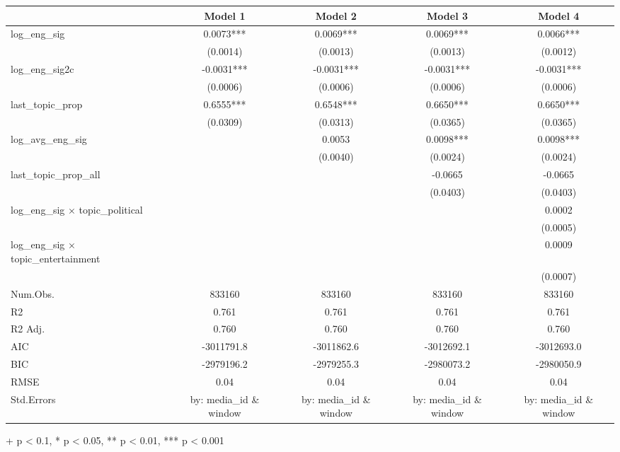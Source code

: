 \setlength{\LTpost}{0mm}
\begin{longtable}{lcccc}
\toprule
  & Model 1 & Model 2 & Model 3 & Model 4 \\ 
\midrule
log\_eng\_sig & 0.0073*** & 0.0069*** & 0.0069*** & 0.0066*** \\ 
 & (0.0014) & (0.0013) & (0.0013) & (0.0012) \\ 
log\_eng\_sig2c & -0.0031*** & -0.0031*** & -0.0031*** & -0.0031*** \\ 
 & (0.0006) & (0.0006) & (0.0006) & (0.0006) \\ 
last\_topic\_prop & 0.6555*** & 0.6548*** & 0.6650*** & 0.6650*** \\ 
 & (0.0309) & (0.0313) & (0.0365) & (0.0365) \\ 
log\_avg\_eng\_sig &  & 0.0053 & 0.0098*** & 0.0098*** \\ 
 &  & (0.0040) & (0.0024) & (0.0024) \\ 
last\_topic\_prop\_all &  &  & -0.0665 & -0.0665 \\ 
 &  &  & (0.0403) & (0.0403) \\ 
log\_eng\_sig × topic\_political &  &  &  & 0.0002 \\ 
 &  &  &  & (0.0005) \\ 
log\_eng\_sig × topic\_entertainment &  &  &  & 0.0009 \\ 
 &  &  &  & (0.0007) \\ 
Num.Obs. & 833160 & 833160 & 833160 & 833160 \\ 
R2 & 0.761 & 0.761 & 0.761 & 0.761 \\ 
R2 Adj. & 0.760 & 0.760 & 0.760 & 0.760 \\ 
AIC & -3011791.8 & -3011862.6 & -3012692.1 & -3012693.0 \\ 
BIC & -2979196.2 & -2979255.3 & -2980073.2 & -2980050.9 \\ 
RMSE & 0.04 & 0.04 & 0.04 & 0.04 \\ 
Std.Errors & by: media\_id \& window & by: media\_id \& window & by: media\_id \& window & by: media\_id \& window \\ 
\bottomrule
\end{longtable}
\begin{minipage}{\linewidth}
+ p < 0.1, * p < 0.05, ** p < 0.01, *** p < 0.001\\
\end{minipage}

